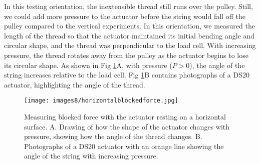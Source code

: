 In this testing orientation, the inextensible thread still runs over the pulley. Still, we could add more pressure to the actuator before the string would fall off the pulley compared to the vertical experiments. In this orientation, we measured the length of the thread so that the actuator maintained its initial bending angle and circular shape, and the thread was perpendicular to the load cell. With increasing pressure, the thread rotates away from the pulley as the actuator begins to lose its circular shape. As shown in Fig \ref{fig:horizontalblockedforce}A, with pressure ($P > 0$), the angle of the string increases relative to the load cell. Fig \ref{fig:horizontalblockedforce}B contains photographs of a DS20 actuator, highlighting the angle of the thread. 

\begin{figure}[ht]
    \centering
     \texttt{[image: images8/horizontalblockedforce.jpg]}
    \caption{Measuring blocked force with the actuator resting on a horizontal surface. A. Drawing of how the shape of the actuator changes with pressure, showing how the angle of the thread changes. B. Photographs of a DS20 actuator with an orange line showing the angle of the string with increasing pressure.}
    \label{fig:horizontalblockedforce}
\end{figure}